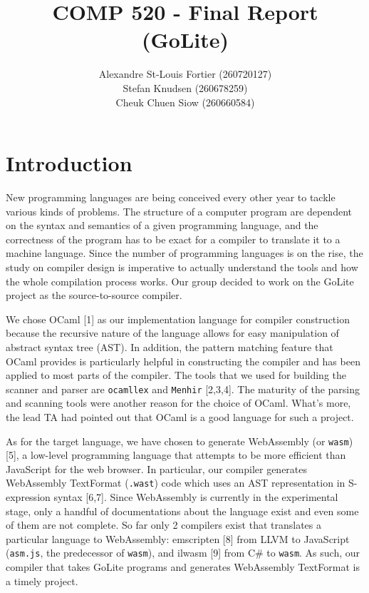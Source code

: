 \documentclass{article}
\begin{document}
\title{COMP 520 - Final Report (GoLite)}
\author{
Alexandre St-Louis Fortier (260720127)\\
Stefan Knudsen (260678259)\\
Cheuk Chuen Siow (260660584)}
\maketitle

\raggedright
\section{Introduction}
New programming languages are being conceived every other year to tackle various kinds of problems. The structure of a computer program are dependent on the syntax and semantics of a given programming language, and the correctness of the program has to be exact for a compiler to translate it to a machine language. Since the number of programming languages is on the rise, the study on compiler design is imperative to actually understand the tools and how the whole compilation process works. Our group decided to work on the GoLite project as the source-to-source compiler.

We chose OCaml [1] as our implementation language for compiler construction because the recursive nature of the language allows for easy manipulation of abstract syntax tree (AST). In addition, the pattern matching feature that OCaml provides is particularly helpful in constructing the compiler and has been applied to most parts of the compiler. The tools that we used for building the scanner and parser are \verb|ocamllex| and \verb|Menhir| [2,3,4]. The maturity of the parsing and scanning tools were another reason for the choice of OCaml. What's more, the lead TA had pointed out that OCaml is a good language for such a project.

As for the target language, we have chosen to generate WebAssembly (or \verb|wasm|) [5], a low-level programming language that attempts to be more efficient than JavaScript for the web browser. In particular, our compiler generates WebAssembly TextFormat (\verb|.wast|) code which uses an AST representation in S-expression syntax [6,7]. Since WebAssembly is currently in the experimental stage, only a handful of documentations about the language exist and even some of them are not complete. So far only 2 compilers exist that translates a particular language to WebAssembly: emscripten [8] from LLVM to JavaScript (\verb|asm.js|, the predecessor of \verb|wasm|), and ilwasm [9] from C\# to \verb|wasm|. As such, our compiler that takes GoLite programs and generates WebAssembly TextFormat is a timely project.
\end{document}

